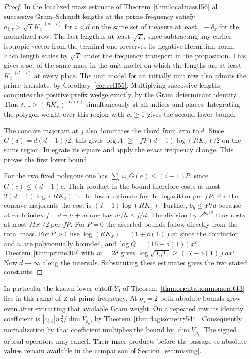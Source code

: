 \documentclass[a4paper,11pt]{article}
\theoremstyle{definition}
\theoremstyle{remark}
\numberwithin{equation}{section}
\begin{document}
\begin{proof}
In the localized mass estimate of Theorem~\ref{thm:localmass156}
all successive Gram--Schmidt lengths at the prime frequency
satisfy \(a_{i,\tau}>\sqrt T K_x^{-(d-i)}\) for \(i<d\)
on the same set of measure at least \(1-\delta_x\) for the
normalized row. The last length is at least \(\sqrt T\),
since subtracting any earlier isotropic vector from the terminal
one preserves its negative Hermitian norm. Each length scales by
\(\sqrt T\) under the frequency transport in the proposition.
This gives a set of the same mass in the unit model on which the
lengths are at least \(K_x^{-(d-i)}\) at every place. The
unit model for an initially unit row also admits the prime
translate, by Corollary~\ref{cor:rel155}. Multiplying successive
lengths computes the positive prefix wedge exactly, by the
Gram determinant identity. Thus \(t_{e,\tau}\ge(RK_x)^{-G(e)}\)
simultaneously at all indices and places. Integrating the
polygon weight over this region with \(v_\tau\ge1\) gives
the second lower bound.

The concave majorant at \(j\) also dominates the chord from
zero to \(d\). Since \(G(d)=d(d-1)/2\), this gives
\(\log A_1\ge-fP(d-1)\log(RK_x)/2\) on the same region.
Integrate its square and apply the exact frequency change.
This proves the first lower bound.

For the two fixed polygons one has
\(\sum_e\omega_e G(e)\le(d-1)P\), since \(G(e)\le(d-1)e\).
Their product in the bound therefore costs at most
\(2(d-1)\log(RK_x)\) in the lower estimate for the logarithm
per \(fP\). For the concave majorants the cost is
\((d-1)\log(RK_x)\). Further, \(b_h\le P/d\) because at
each index \(j=d-h+m\) one has \(m/h\le j/d\).
The division by \(Z^{b_h/2}\) thus costs at most
\(M x^\varepsilon/2\) per \(fP\). For \(P=0\) the asserted
bounds follow directly from the total mass. For \(P>0\)
use \(\log(RK_x)=(1+o(1))x^\varepsilon\) since the conductor
and \(n\) are polynomially bounded, and
\(\log Q=(16+o(1))x^\varepsilon\).
Theorem~\ref{thm:prime209} with \(m=2d\) gives
\(\log\sqrt{T_0T_1}\ge(17-o(1))d x^\varepsilon\).
Now \(d\to\infty\) along the intervals. Substituting these
estimates gives the two stated constants.
\end{proof}

In particular the known lower cutoff \(Y_0\) of
Theorem~\ref{thm:orientationmoment613} lies in this range of
\(Z\) at prime frequency. At \(p_j=2\) both absolute bounds
grow even after extracting that available Gram weight. On a
repeated row its identity coefficient is
\(|c_{b,b}|w_b^2/\dim V_{\rho_b}\), by
Theorem~\ref{thm:flagisometry544}. Consequently normalization by
that coefficient multiplies the bound by \(\dim V_{\rho_b}\).
The signed orbital operators may cancel. Their inner products
before the passage to absolute values remain available in the
comparison of Section~\ref{sec:missing}.
\end{document}
